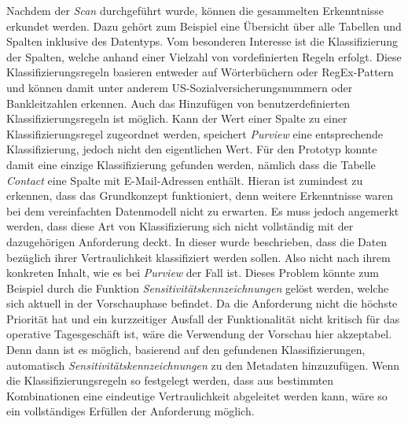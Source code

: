 Nachdem der \textit{Scan} durchgeführt wurde, können die gesammelten Erkenntnisse erkundet werden. Dazu gehört zum Beispiel eine Übersicht über alle Tabellen und Spalten inklusive des Datentyps. Vom besonderen Interesse ist die Klassifizierung der Spalten, welche anhand einer Vielzahl von vordefinierten Regeln erfolgt. Diese Klassifizierungsregeln basieren entweder auf Wörterbüchern oder RegEx-Pattern und können damit unter anderem US-Sozialversicherungsnummern oder Bankleitzahlen erkennen. Auch das Hinzufügen von benutzerdefinierten Klassifizierungsregeln ist möglich. Kann der Wert einer Spalte zu einer Klassifizierungsregel zugeordnet werden, speichert \textit{Purview} eine entsprechende Klassifizierung, jedoch nicht den eigentlichen Wert. Für den Prototyp konnte damit eine einzige Klassifizierung gefunden werden, nämlich dass die Tabelle \textit{Contact} eine Spalte mit E-Mail-Adressen enthält. Hieran ist zumindest zu erkennen, dass das Grundkonzept funktioniert, denn weitere Erkenntnisse waren bei dem vereinfachten Datenmodell nicht zu erwarten. Es muss jedoch angemerkt werden, dass diese Art von Klassifizierung sich nicht vollständig mit der dazugehörigen Anforderung deckt. In dieser wurde beschrieben, dass die  Daten bezüglich ihrer Vertraulichkeit klassifiziert werden sollen. Also nicht nach ihrem konkreten Inhalt, wie es bei \textit{Purview} der Fall ist. Dieses Problem könnte zum Beispiel durch die Funktion \textit{Sensitivitätskennzeichnungen} gelöst werden, welche sich aktuell in der Vorschauphase befindet. Da die Anforderung nicht die höchste Priorität hat und ein kurzzeitiger Ausfall der Funktionalität nicht kritisch für das operative Tagesgeschäft ist, wäre die Verwendung der Vorschau hier akzeptabel. Denn dann ist es möglich, basierend auf den gefundenen Klassifizierungen, automatisch \textit{Sensitivitätskennzeichnungen} zu den Metadaten hinzuzufügen. Wenn die Klassifizierungsregeln so festgelegt werden, dass aus bestimmten Kombinationen eine eindeutige Vertraulichkeit abgeleitet werden kann, wäre so ein vollständiges Erfüllen der Anforderung möglich. 



